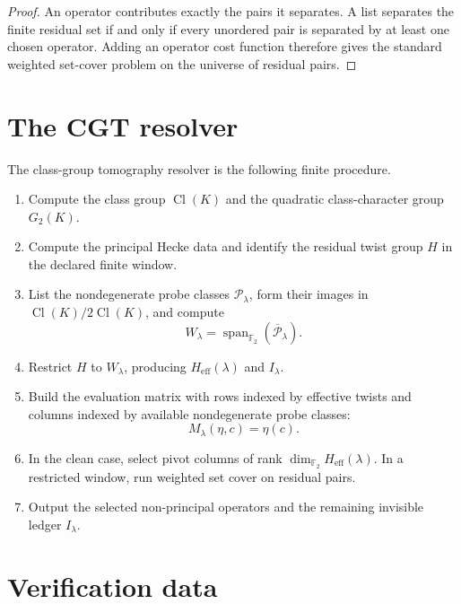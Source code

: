 \documentclass[11pt]{article}
\DeclareMathOperator{\Cl}{Cl}
\DeclareMathOperator{\Span}{span}
\begin{document}
\begin{proof}
An operator contributes exactly the pairs it separates.  A list separates the finite residual set if and only if every unordered pair is separated by at least one chosen operator.  Adding an operator cost function therefore gives the standard weighted set-cover problem on the universe of residual pairs.
\end{proof}

\section{The CGT resolver}

The class-group tomography resolver is the following finite procedure.

\begin{enumerate}[label=\textup{(\roman*)}]
\item Compute the class group \(\Cl(K)\) and the quadratic class-character group \(G_2(K)\).
\item Compute the principal Hecke data and identify the residual twist group \(H\) in the declared finite window.
\item List the nondegenerate probe classes \(\mathcal P_\lambda\), form their images in \(\Cl(K)/2\Cl(K)\), and compute
\[
W_\lambda=\Span_{\mathbb F_2}(\overline{\mathcal P}_\lambda).
\]
\item Restrict \(H\) to \(W_\lambda\), producing \(H_{\mathrm{eff}}(\lambda)\) and \(I_\lambda\).
\item Build the evaluation matrix with rows indexed by effective twists and columns indexed by available nondegenerate probe classes:
\[
M_\lambda(\eta,c)=\eta(c).
\]
\item In the clean case, select pivot columns of rank \(\dim_{\mathbb F_2}H_{\mathrm{eff}}(\lambda)\).  In a restricted window, run weighted set cover on residual pairs.
\item Output the selected non-principal operators and the remaining invisible ledger \(I_\lambda\).
\end{enumerate}

\section{Verification data}
\end{document}
